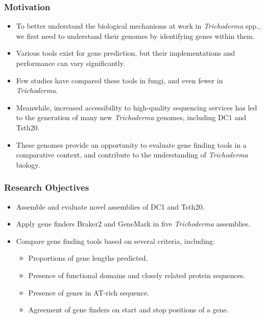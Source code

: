 \documentclass[t]{beamer}
\begin{document}
\begin{frame}
	\frametitle{Motivation} 
	\begin{itemize}
		\item To better understand the biological mechanisms at work in \textit{Trichoderma} spp., we first need to understand their genomes by identifying genes within them.
		\item Various tools exist for gene prediction, but their implementations and performance can vary significantly.
		\item Few studies have compared these tools in fungi, and even fewer in \textit{Trichoderma}.
		\item Meanwhile, increased accessibility to high-quality sequencing services has led to the generation of many new \textit{Trichoderma} genomes, including DC1 and Tsth20.
		\item These genomes provide an opportunity to evaluate gene finding tools in a comparative context, and contribute to the understanding of \textit{Trichoderma} biology. 
	\end{itemize}
\end{frame}

\begin{frame}
	\frametitle{Research Objectives}
	\begin{itemize}
		\item Assemble and evaluate novel assemblies of DC1 and Tsth20.
		\item Apply gene finders Braker2 and GeneMark in five \textit{Trichoderma} assemblies.
		\item Compare gene finding tools based on several criteria, including:
		\begin{itemize}
			 \item Proportions of gene lengths predicted.
			 \item Presence of functional domains and closely related protein sequences.
			 \item Presence of genes in AT-rich sequence.
			 \item Agreement of gene finders on start and stop positions of a gene. 
		\end{itemize}
	\end{itemize}
\end{frame}
\end{document}
